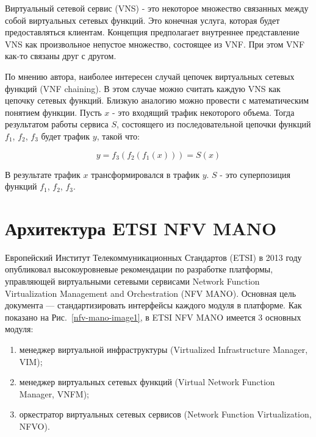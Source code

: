 \documentclass[oneside,final,14pt,a4paper]{extreport}
\begin{document}
Виртуальный сетевой сервис (VNS) - это некоторое множество связанных между собой виртуальных сетевых функций. Это конечная услуга, которая будет предоставляться клиентам. Концепция предполагает внутреннее представление VNS как произвольное непустое множество, состоящее из VNF. При этом VNF как-то связаны друг с другом.

По мнению автора, наиболее интересен случай цепочек виртуальных сетевых функций (VNF chaining). В этом случае можно считать каждую VNS как цепочку сетевых функций. Близкую аналогию можно провести с математическим понятием функции. Пусть $x$ - это входящий трафик некоторого объема. Тогда результатом работы сервиса $S$, состоящего из последовательной цепочки функций $f_{1}$, $f_{2}$, $f_{3}$ будет трафик $y$, такой что:

\begin{equation}
	\label{eq:service_example}
	y = f_3(f_2(f_1(x))) = S(x)
\end{equation}

В результате трафик $x$ трансформировался в трафик $y$. $S$ - это суперпозиция функций $f_{1}$, $f_{2}$, $f_{3}$.


\section{Архитектура ETSI NFV MANO}
\label{sec:etsi_nfv_mano}
Европейский Институт Телекоммуникационных Стандартов (ETSI) в 2013 году опубликовал высокоуровневые рекомендации по разработке платформы, управляющей виртуальными сетевыми сервисами Network Function Virtualization Management and Orchestration (NFV MANO). Основная цель документа --- стандартизировать интерфейсы каждого модуля в платформе.\cite{nfv-mano-state1} Как показано на Рис.~\ref{nfv-mano-image1}, в ETSI NFV MANO имеется 3 основных модуля:

\begin{enumerate}
	\item менеджер виртуальной инфраструктуры (Virtualized Infrastructure Manager, VIM);
	\item менеджер виртуальных сетевых функций (Virtual Network Function Manager, VNFM);
	\item оркестратор виртуальных сетевых сервисов (Network Function Virtualization, NFVO).
\end{enumerate}
\end{document}
